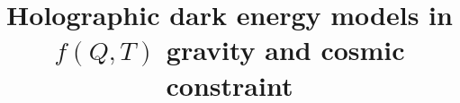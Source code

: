 \documentclass[preprint]{aastex631}
\begin{document}
\title{Holographic dark energy models in $f(Q,T)$ gravity and cosmic constraint}


\end{document}
